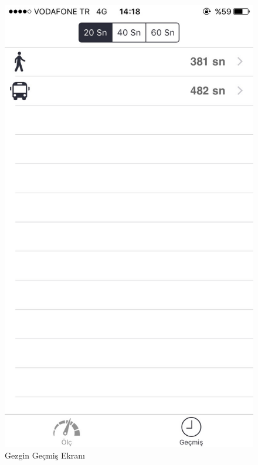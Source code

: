 \begin{figure}[!htbp]
\centering
\includegraphics[scale=0.2]{projectChapters/images/IMG_0366.jpg}
\caption{Gezgin Geçmiş Ekranı}
\end{figure}

